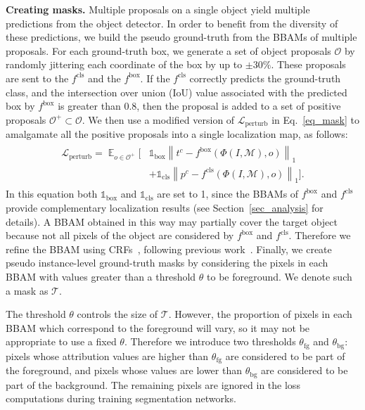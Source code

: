 \documentclass[final]{cvpr}
\DeclareMathOperator{\E}{\mathbb{E}}
\begin{document}
\textbf{Creating masks.} 
Multiple proposals on a single object yield multiple predictions from the object detector. 
In order to benefit from the diversity of these predictions, we build the pseudo ground-truth from the BBAMs of multiple proposals.
For each ground-truth box, we generate a set of object proposals $\mathcal{O}$ by randomly jittering each coordinate of the box by up to $\pm30\%$.
These proposals are sent to the $f^{\text{cls}}$ and the $f^{\text{box}}$. If the $f^{\text{cls}}$ correctly predicts the ground-truth class, and the intersection over union (IoU) value associated with the predicted box by $f^{\text{box}}$ is greater than 0.8, then the proposal is added to a set of positive proposals $\mathcal{O}^+ \subset \mathcal{O}$.
We then use a modified version of $\mathcal{L}_{\text{perturb}}$ in Eq.~\ref{eq_mask} to amalgamate all the positive proposals into a single localization map, as follows:
\begin{align}\label{eq_mask_weak}
\begin{split}
\mathcal{L}_{\text{perturb}} = \E_{o\in \mathcal{O}^{+}}[&\mathbb{1}_{\text{box}} \left\lVert t^c - f^{\text{box}}(\Phi(I, \mathcal{M}), o) \right\rVert_1\\ &+ \mathbb{1}_{\text{cls}} \left\lVert p^c - f^{\text{cls}}(\Phi(I, \mathcal{M}), o) \right\rVert_1].
\end{split}
\end{align}
In this equation both $\mathbb{1}_{\text{box}}$ and $\mathbb{1}_{\text{cls}}$ are set to 1, since the BBAMs of $f^{\text{box}}$ and $f^{\text{cls}}$ provide complementary localization results (see Section~\ref{sec_analysis} for details).
A BBAM obtained in this way may partially cover the target object because not all pixels of the object are considered by $f^{\text{box}}$ and $f^{\text{cls}}$. 
Therefore we refine the BBAM using CRFs~\cite{krahenbuhl2011efficient}, following previous work~\cite{song2019box, ahn2018learning, khoreva2017simple}.
Finally, we create pseudo instance-level ground-truth masks by considering the pixels in each BBAM with values greater than a threshold $\theta$ to be foreground.
We denote such a mask as $\mathcal{T}$.


The threshold $\theta$ controls the size of $\mathcal{T}$.
However, the proportion of pixels in each BBAM which correspond to the foreground will vary, so it may not be appropriate to use a fixed $\theta$. Therefore we introduce two thresholds $\theta_{\text{fg}}$ and $\theta_{\text{bg}}$: pixels whose attribution values are higher than $\theta_{\text{fg}}$ are considered to be part of the foreground, and pixels whose values are lower than $\theta_{\text{bg}}$ are considered to be part of the background. The remaining pixels are ignored in the loss computations during training segmentation networks.
\end{document}
